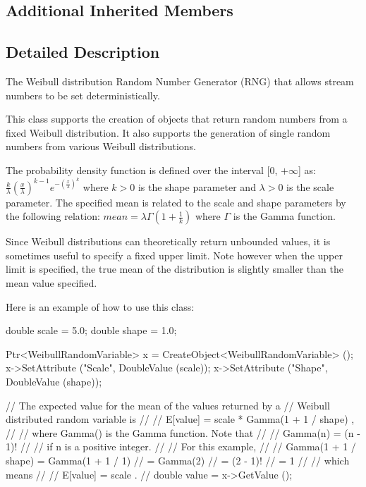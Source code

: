 \subsection*{Additional Inherited Members}


\subsection{Detailed Description}
The Weibull distribution Random Number Generator (R\+NG) that allows stream numbers to be set deterministically. 

This class supports the creation of objects that return random numbers from a fixed Weibull distribution. It also supports the generation of single random numbers from various Weibull distributions.

The probability density function is defined over the interval \mbox{[}0, $+\infty$\mbox{]} as\+: $ \frac{k}{\lambda}\left(\frac{x}{\lambda}\right)^{k-1}e^{-\left(\frac{x}{\lambda}\right)^k} $ where $ k > 0$ is the shape parameter and $ \lambda > 0$ is the scale parameter. The specified mean is related to the scale and shape parameters by the following relation\+: $ mean = \lambda\Gamma\left(1+\frac{1}{k}\right) $ where $ \Gamma $ is the Gamma function.

Since Weibull distributions can theoretically return unbounded values, it is sometimes useful to specify a fixed upper limit. Note however when the upper limit is specified, the true mean of the distribution is slightly smaller than the mean value specified.

Here is an example of how to use this class\+: 
\begin{DoxyCode}
\textcolor{keywordtype}{double} scale = 5.0;
\textcolor{keywordtype}{double} shape = 1.0;

Ptr<WeibullRandomVariable> x = CreateObject<WeibullRandomVariable> ();
x->SetAttribute (\textcolor{stringliteral}{"Scale"}, DoubleValue (scale));
x->SetAttribute (\textcolor{stringliteral}{"Shape"}, DoubleValue (shape));

\textcolor{comment}{// The expected value for the mean of the values returned by a}
\textcolor{comment}{// Weibull distributed random variable is}
\textcolor{comment}{//}
\textcolor{comment}{//     E[value]  =  scale * Gamma(1 + 1 / shape)  ,}
\textcolor{comment}{//               }
\textcolor{comment}{// where Gamma() is the Gamma function.  Note that }
\textcolor{comment}{//               }
\textcolor{comment}{//     Gamma(n)  =  (n - 1)!}
\textcolor{comment}{//               }
\textcolor{comment}{// if n is a positive integer.}
\textcolor{comment}{//}
\textcolor{comment}{// For this example,}
\textcolor{comment}{//}
\textcolor{comment}{//     Gamma(1 + 1 / shape)  =  Gamma(1 + 1 / 1)}
\textcolor{comment}{//                           =  Gamma(2)}
\textcolor{comment}{//                           =  (2 - 1)!}
\textcolor{comment}{//                           =  1}
\textcolor{comment}{//}
\textcolor{comment}{// which means}
\textcolor{comment}{//}
\textcolor{comment}{//     E[value]  =  scale  .}
\textcolor{comment}{//               }
\textcolor{keywordtype}{double} value = x->GetValue ();
\end{DoxyCode}
 

